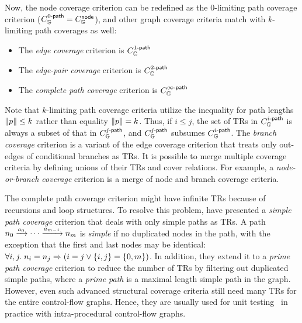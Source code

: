 Now, the node coverage criterion can be redefined as the 0-limiting path
coverage criterion ($C_{\mathbb{G}}^{{0}\textsf{-path}} = C_{\mathbb{G}}^{\textsf{node}}$), and other graph
coverage criteria match with $k$-limiting path coverages as well:
\begin{itemize}
  \item The \textit{edge coverage} criterion is $C_{\mathbb{G}}^{{1}\textsf{-path}}$
  \item The \textit{edge-pair coverage} criterion is $C_{\mathbb{G}}^{{2}\textsf{-path}}$
  \item The \textit{complete path coverage} criterion is
    $C_{\mathbb{G}}^{{\infty}\textsf{-path}}$
\end{itemize}
%
Note that $k$-limiting path coverage criteria utilize the inequality for path
lengths $\lVert{p}\rVert \leq k$ rather than equality $\lVert{p}\rVert = k$.
%
Thus, if $i \leq j$, the set of TRs in $C_{\mathbb{G}}^{{i}\textsf{-path}}$ is always a subset
of that in $C_{\mathbb{G}}^{{j}\textsf{-path}}$, and $C_{\mathbb{G}}^{{j}\textsf{-path}}$ subsumes
$C_{\mathbb{G}}^{{i}\textsf{-path}}$.
%
The \textit{branch coverage} criterion is a variant of the edge coverage
criterion that treats only out-edges of conditional branches as TRs.
%
It is possible to merge multiple coverage criteria by defining unions of their
TRs and cover relations.
%
For example, a \textit{node-or-branch coverage} criterion is a merge
of node and branch coverage criteria.


The complete path coverage criterion might have infinite TRs because of
recursions and loop structures.
%
To resolve this problem, \citet{cov-def} have presented a \textit{simple path
coverage} criterion that deals with only simple paths as TRs.
%
A path $n_0 \xrightarrow{a_0} \cdots \xrightarrow{a_{m-1}} n_m$ is
\textit{simple} if no duplicated nodes in the path, with the exception that the
first and last nodes may be identical: $\forall i, j. \; n_i = n_j
\Rightarrow (i = j \vee \{ i, j \} = \{ 0, m \})$.
%
In addition, they extend it to a \textit{prime path coverage} criterion to
reduce the number of TRs by filtering out duplicated simple paths, where a
\textit{prime path} is a maximal length simple path in the graph.
%
However, even such advanced structural coverage criteria still need many
TRs for the entire control-flow graphs.
%
Hence, they are usually used for unit testing~\cite{unit-test} in practice
with intra-procedural control-flow graphs.


